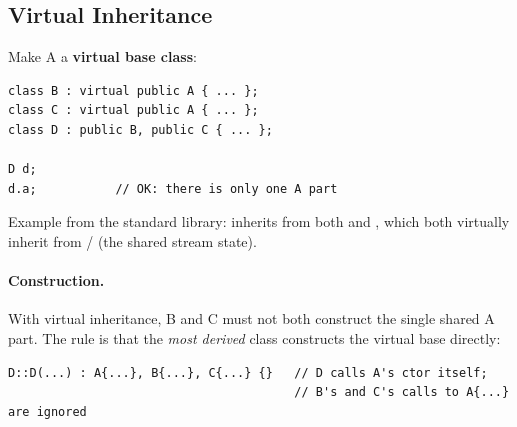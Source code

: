 \subsection{Virtual Inheritance}
Make A a \textbf{virtual base class}:
\begin{lstlisting}[style=cpp]
class B : virtual public A { ... };
class C : virtual public A { ... };
class D : public B, public C { ... };

D d;
d.a;           // OK: there is only one A part
\end{lstlisting}
Example from the standard library:  inherits from both
 and , which both virtually inherit from
/ (the shared stream state).
\begin{center}
\end{center}

\paragraph{Construction.} With virtual inheritance, B and C must not both
construct the single shared A part. The rule is that the \emph{most derived}
class constructs the virtual base directly:
\begin{lstlisting}[style=cpp]
D::D(...) : A{...}, B{...}, C{...} {}   // D calls A's ctor itself;
                                        // B's and C's calls to A{...} are ignored
\end{lstlisting}

